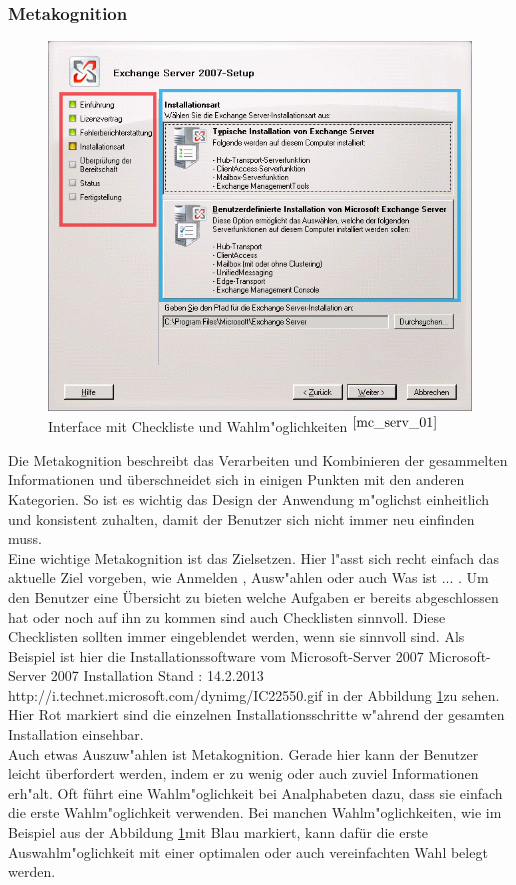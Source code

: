 \subsubsection{Metakognition}
\begin{figure}[h]
	\centering
		\includegraphics[width=1.00\textwidth]{Daten/ServerBeispiel.png}
	\caption{Interface mit Checkliste und Wahlm"oglichkeiten $^{\ref{mc_serv_01}}$}
	\label{fig:InstallBsp}
\end{figure}
Die Metakognition beschreibt das Verarbeiten und Kombinieren der gesammelten Informationen und überschneidet sich in einigen Punkten mit den anderen Kategorien. So ist es wichtig das Design der Anwendung m"oglichst einheitlich und konsistent zuhalten, damit der Benutzer sich nicht immer neu einfinden muss.\\
Eine wichtige Metakognition ist das Zielsetzen. Hier l"asst sich recht einfach das aktuelle Ziel vorgeben, wie \glqq Anmelden \grqq, \glqq Ausw"ahlen \grqq oder auch \glqq Was ist ... \grqq.  Um den Benutzer eine Übersicht zu bieten welche Aufgaben er bereits abgeschlossen hat oder noch auf ihn zu kommen sind auch Checklisten sinnvoll. Diese Checklisten sollten immer eingeblendet werden, wenn sie sinnvoll sind. Als Beispiel ist hier die Installationssoftware vom Microsoft-Server 2007
						{Microsoft-Server 2007 Installation}
						{Stand : 14.2.2013}
						{http://i.technet.microsoft.com/dynimg/IC22550.gif} 
in der Abbildung \ref{fig:InstallBsp}zu sehen. Hier Rot markiert sind die einzelnen Installationsschritte w"ahrend der gesamten Installation einsehbar.\\
Auch etwas Auszuw"ahlen ist Metakognition. Gerade hier kann der Benutzer leicht überfordert werden, indem er zu wenig oder auch zuviel Informationen erh"alt. Oft führt eine Wahlm"oglichkeit bei Analphabeten dazu, dass sie einfach die erste Wahlm"oglichkeit verwenden. Bei manchen Wahlm"oglichkeiten, wie im Beispiel aus der Abbildung \ref{fig:InstallBsp}mit Blau markiert, kann dafür die erste Auswahlm"oglichkeit mit einer optimalen oder auch vereinfachten Wahl belegt werden.

